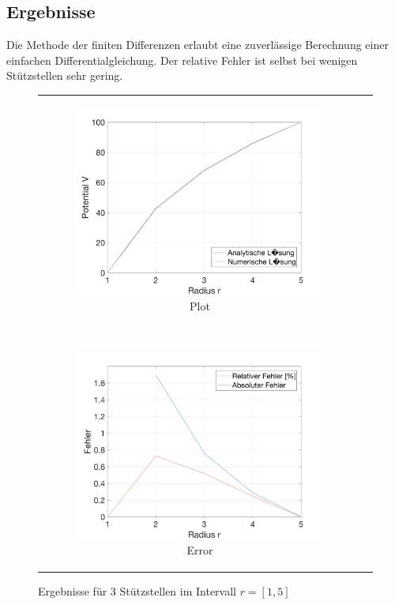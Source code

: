 	\subsection{Ergebnisse}
	
	Die Methode der finiten Differenzen erlaubt eine zuverlässige Berechnung einer einfachen Differentialgleichung. Der relative Fehler ist selbst bei wenigen Stützstellen sehr gering.
		
	\begin{figure}[!h]
		\centering
	\begin{tabular}{cc}
		\begin{subfigure}{0.45\linewidth}
			\includegraphics[width=\linewidth]{../Matlab/cylinder}
			\caption{Plot}
			\label{fig:cylinder}
		\end{subfigure}
		~
		\begin{subfigure}{0.45\linewidth}
			
			\includegraphics[width=\linewidth]{../Matlab/error}
			\caption{Error}
			\label{fig:error}
		\end{subfigure}
		
	\end{tabular}
	\caption{Ergebnisse für 3 Stützstellen im Intervall $r=[1,5]$}
	\end{figure}

